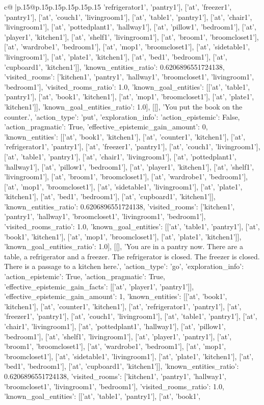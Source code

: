\documentclass{article}
\begin{document}
{\begin{supertabular}{c@{$\;$}|p{.15\linewidth}@{}p{.15\linewidth}p{.15\linewidth}p{.15\linewidth}p{.15\linewidth}p{.15\linewidth}}
{{{'refrigerator1', 'pantry1'], ['at', 'freezer1', 'pantry1'], ['at', 'couch1', 'livingroom1'], ['at', 'table1', 'pantry1'], ['at', 'chair1', 'livingroom1'], ['at', 'pottedplant1', 'hallway1'], ['at', 'pillow1', 'bedroom1'], ['at', 'player1', 'kitchen1'], ['at', 'shelf1', 'livingroom1'], ['at', 'broom1', 'broomcloset1'], ['at', 'wardrobe1', 'bedroom1'], ['at', 'mop1', 'broomcloset1'], ['at', 'sidetable1', 'livingroom1'], ['at', 'plate1', 'kitchen1'], ['at', 'bed1', 'bedroom1'], ['at', 'cupboard1', 'kitchen1']], 'known_entities_ratio': 0.6206896551724138, 'visited_rooms': ['kitchen1', 'pantry1', 'hallway1', 'broomcloset1', 'livingroom1', 'bedroom1'], 'visited_rooms_ratio': 1.0, 'known_goal_entities': [['at', 'table1', 'pantry1'], ['at', 'book1', 'kitchen1'], ['at', 'mop1', 'broomcloset1'], ['at', 'plate1', 'kitchen1']], 'known_goal_entities_ratio': 1.0}}], [[], 'You put the book on the counter.', {'action_type': 'put', 'exploration_info': {'action_epistemic': False, 'action_pragmatic': True, 'effective_epistemic_gain_amount': 0, 'known_entities': [['at', 'book1', 'kitchen1'], ['at', 'counter1', 'kitchen1'], ['at', 'refrigerator1', 'pantry1'], ['at', 'freezer1', 'pantry1'], ['at', 'couch1', 'livingroom1'], ['at', 'table1', 'pantry1'], ['at', 'chair1', 'livingroom1'], ['at', 'pottedplant1', 'hallway1'], ['at', 'pillow1', 'bedroom1'], ['at', 'player1', 'kitchen1'], ['at', 'shelf1', 'livingroom1'], ['at', 'broom1', 'broomcloset1'], ['at', 'wardrobe1', 'bedroom1'], ['at', 'mop1', 'broomcloset1'], ['at', 'sidetable1', 'livingroom1'], ['at', 'plate1', 'kitchen1'], ['at', 'bed1', 'bedroom1'], ['at', 'cupboard1', 'kitchen1']], 'known_entities_ratio': 0.6206896551724138, 'visited_rooms': ['kitchen1', 'pantry1', 'hallway1', 'broomcloset1', 'livingroom1', 'bedroom1'], 'visited_rooms_ratio': 1.0, 'known_goal_entities': [['at', 'table1', 'pantry1'], ['at', 'book1', 'kitchen1'], ['at', 'mop1', 'broomcloset1'], ['at', 'plate1', 'kitchen1']], 'known_goal_entities_ratio': 1.0}}], [[], 'You are in a pantry now. There are a table, a refrigerator and a freezer. The refrigerator is closed. The freezer is closed. There is a passage to a kitchen here.', {'action_type': 'go', 'exploration_info': {'action_epistemic': True, 'action_pragmatic': True, 'effective_epistemic_gain_facts': [['at', 'player1', 'pantry1']], 'effective_epistemic_gain_amount': 1, 'known_entities': [['at', 'book1', 'kitchen1'], ['at', 'counter1', 'kitchen1'], ['at', 'refrigerator1', 'pantry1'], ['at', 'freezer1', 'pantry1'], ['at', 'couch1', 'livingroom1'], ['at', 'table1', 'pantry1'], ['at', 'chair1', 'livingroom1'], ['at', 'pottedplant1', 'hallway1'], ['at', 'pillow1', 'bedroom1'], ['at', 'shelf1', 'livingroom1'], ['at', 'player1', 'pantry1'], ['at', 'broom1', 'broomcloset1'], ['at', 'wardrobe1', 'bedroom1'], ['at', 'mop1', 'broomcloset1'], ['at', 'sidetable1', 'livingroom1'], ['at', 'plate1', 'kitchen1'], ['at', 'bed1', 'bedroom1'], ['at', 'cupboard1', 'kitchen1']], 'known_entities_ratio': 0.6206896551724138, 'visited_rooms': ['kitchen1', 'pantry1', 'hallway1', 'broomcloset1', 'livingroom1', 'bedroom1'], 'visited_rooms_ratio': 1.0, 'known_goal_entities': [['at', 'table1', 'pantry1'], ['at', 'book1', }}}
\end{supertabular}}
\end{document}
